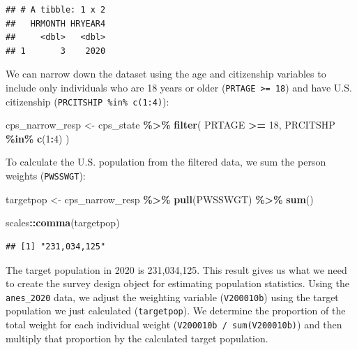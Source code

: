 \documentclass[
]{krantz}
\makeatletter
\newenvironment{Shaded}{\begin{snugshade}}{\end{snugshade}}
\newcommand{\DecValTok}[1]{\textcolor[rgb]{0.06,0.06,0.06}{#1}}
\newcommand{\FunctionTok}[1]{\textcolor[rgb]{0.27,0.27,0.27}{\textbf{#1}}}
\newcommand{\NormalTok}[1]{#1}
\newcommand{\OtherTok}[1]{\textcolor[rgb]{0.37,0.37,0.37}{#1}}
\newcommand{\SpecialCharTok}[1]{\textcolor[rgb]{0.43,0.43,0.43}{\textbf{#1}}}
\newenvironment{kframe}{%
\medskip{}
\setlength{\fboxsep}{.8em}
 \def\at@end@of@kframe{}%
 \ifinner\ifhmode%
  \def\at@end@of@kframe{\end{minipage}}%
  \begin{minipage}{\columnwidth}%
 \fi\fi%
 \def\FrameCommand##1{\hskip\@totalleftmargin \hskip-\fboxsep
 \colorbox{shadecolor}{##1}\hskip-\fboxsep
     \hskip-\linewidth \hskip-\@totalleftmargin \hskip\columnwidth}%
 \MakeFramed {\advance\hsize-\width
   \@totalleftmargin\z@ \linewidth\hsize
   \@setminipage}}%
 {\par\unskip\endMakeFramed%
 \at@end@of@kframe}
\renewenvironment{Shaded}{\begin{kframe}}{\end{kframe}}
\makeatother
\begin{document}
\begin{verbatim}
## # A tibble: 1 x 2
##   HRMONTH HRYEAR4
##     <dbl>   <dbl>
## 1       3    2020
\end{verbatim}

We can narrow down the dataset using the age and citizenship variables to include only individuals who are 18 years or older (\texttt{PRTAGE\ \textgreater{}=\ 18}) and have U.S. citizenship (\texttt{PRCITSHIP\ \%in\%\ c(1:4)}):

\begin{Shaded}
\begin{Highlighting}[]
\NormalTok{cps\_narrow\_resp }\OtherTok{\textless{}{-}}\NormalTok{ cps\_state }\SpecialCharTok{\%\textgreater{}\%}
  \FunctionTok{filter}\NormalTok{(}
\NormalTok{    PRTAGE }\SpecialCharTok{\textgreater{}=} \DecValTok{18}\NormalTok{,}
\NormalTok{    PRCITSHP }\SpecialCharTok{\%in\%} \FunctionTok{c}\NormalTok{(}\DecValTok{1}\SpecialCharTok{:}\DecValTok{4}\NormalTok{)}
\NormalTok{  )}
\end{Highlighting}
\end{Shaded}

To calculate the U.S. population from the filtered data, we sum the person weights (\texttt{PWSSWGT}):

\begin{Shaded}
\begin{Highlighting}[]
\NormalTok{targetpop }\OtherTok{\textless{}{-}}\NormalTok{ cps\_narrow\_resp }\SpecialCharTok{\%\textgreater{}\%}
  \FunctionTok{pull}\NormalTok{(PWSSWGT) }\SpecialCharTok{\%\textgreater{}\%}
  \FunctionTok{sum}\NormalTok{()}
\end{Highlighting}
\end{Shaded}

\begin{Shaded}
\begin{Highlighting}[]
\NormalTok{scales}\SpecialCharTok{::}\FunctionTok{comma}\NormalTok{(targetpop)}
\end{Highlighting}
\end{Shaded}

\begin{verbatim}
## [1] "231,034,125"
\end{verbatim}

The target population in 2020 is 231,034,125. This result gives us what we need to create the survey design object for estimating population statistics. Using the \texttt{anes\_2020} data, we adjust the weighting variable (\texttt{V200010b}) using the target population we just calculated (\texttt{targetpop}). We determine the proportion of the total weight for each individual weight (\texttt{V200010b\ /\ sum(V200010b)}) and then multiply that proportion by the calculated target population.
\end{document}
